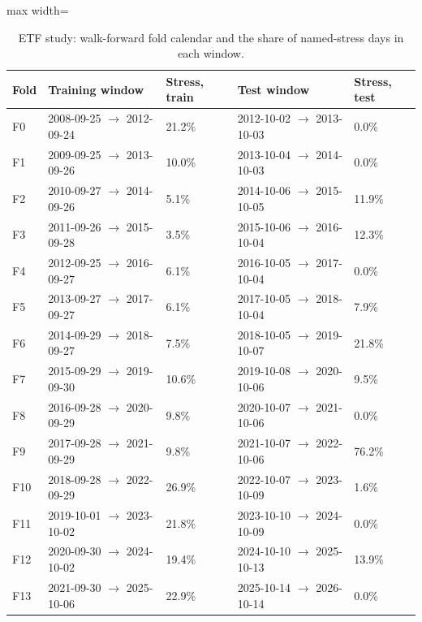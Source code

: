 \documentclass[11pt]{article}
\begin{document}
\begin{table}[!htbp]
\centering\scriptsize
\caption{ETF study: walk-forward fold calendar and the share of named-stress days in each window.\label{tab-fold-cal}}
\begin{adjustbox}{max width=\linewidth}
\begin{tabular}{@{}lllll@{}}
\toprule
Fold & Training window & Stress, train & Test window & Stress, test \\
\midrule
F0 & 2008-09-25 $\to$ 2012-09-24 & 21.2\% & 2012-10-02 $\to$ 2013-10-03 & 0.0\% \\
F1 & 2009-09-25 $\to$ 2013-09-26 & 10.0\% & 2013-10-04 $\to$ 2014-10-03 & 0.0\% \\
F2 & 2010-09-27 $\to$ 2014-09-26 & 5.1\% & 2014-10-06 $\to$ 2015-10-05 & 11.9\% \\
F3 & 2011-09-26 $\to$ 2015-09-28 & 3.5\% & 2015-10-06 $\to$ 2016-10-04 & 12.3\% \\
F4 & 2012-09-25 $\to$ 2016-09-27 & 6.1\% & 2016-10-05 $\to$ 2017-10-04 & 0.0\% \\
F5 & 2013-09-27 $\to$ 2017-09-27 & 6.1\% & 2017-10-05 $\to$ 2018-10-04 & 7.9\% \\
F6 & 2014-09-29 $\to$ 2018-09-27 & 7.5\% & 2018-10-05 $\to$ 2019-10-07 & 21.8\% \\
F7 & 2015-09-29 $\to$ 2019-09-30 & 10.6\% & 2019-10-08 $\to$ 2020-10-06 & 9.5\% \\
F8 & 2016-09-28 $\to$ 2020-09-29 & 9.8\% & 2020-10-07 $\to$ 2021-10-06 & 0.0\% \\
F9 & 2017-09-28 $\to$ 2021-09-29 & 9.8\% & 2021-10-07 $\to$ 2022-10-06 & 76.2\% \\
F10 & 2018-09-28 $\to$ 2022-09-29 & 26.9\% & 2022-10-07 $\to$ 2023-10-09 & 1.6\% \\
F11 & 2019-10-01 $\to$ 2023-10-02 & 21.8\% & 2023-10-10 $\to$ 2024-10-09 & 0.0\% \\
F12 & 2020-09-30 $\to$ 2024-10-02 & 19.4\% & 2024-10-10 $\to$ 2025-10-13 & 13.9\% \\
F13 & 2021-09-30 $\to$ 2025-10-06 & 22.9\% & 2025-10-14 $\to$ 2026-10-14 & 0.0\% \\
\bottomrule
\end{tabular}
\end{adjustbox}
\end{table}
\end{document}

